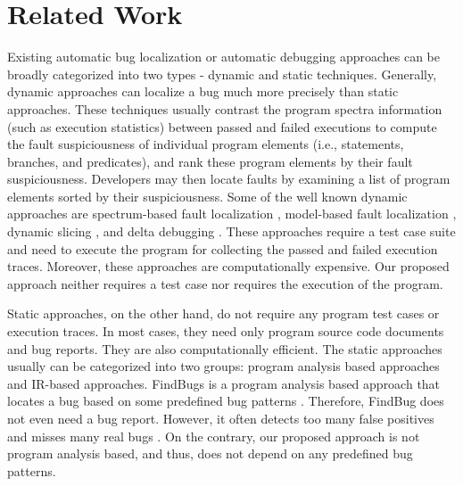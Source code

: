 \documentclass[sigconf,review,anonymous]{acmart}
\begin{document}

\section{Related Work}\label{relatedwork}
Existing automatic bug localization or automatic debugging approaches can be broadly categorized into two types - dynamic and static techniques. Generally, dynamic approaches can localize a bug much more precisely than static approaches. These techniques usually contrast the program spectra information (such as execution statistics) between passed and failed executions to compute the fault suspiciousness of individual program elements (i.e., statements, branches, and predicates), and rank these program elements by their fault suspiciousness. Developers may then locate faults by examining a list of program elements sorted by their suspiciousness. Some of the well known dynamic approaches are spectrum-based fault localization \cite{Abreu,Jones,Lucia,SahaFault}, model-based fault localization \cite{Feldman,Mayer}, dynamic slicing \cite{Zhang:2005}, and delta debugging \cite{Zeller:2002}. These approaches require a test case suite and need to execute the program for collecting the passed and failed execution traces. Moreover, these approaches are computationally expensive. 
Our proposed approach neither requires a test case nor requires the execution of the program. 


Static approaches, on the other hand, do not require any program test cases or execution traces. In most cases, they need only program source code documents and bug reports. They are also computationally efficient. The static approaches usually can be categorized into two groups: program analysis based approaches and IR-based approaches. FindBugs is a program analysis based approach that locates a bug based on some predefined bug patterns \cite{FindBug}. 
Therefore, FindBug does not even need a bug report. However, it often detects too many false positives and misses many real bugs \cite{Tang}. 
On the contrary, our proposed approach is not program analysis based, and thus, does not depend on any predefined bug patterns.
\end{document}
